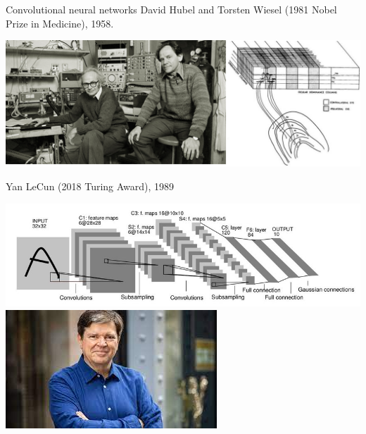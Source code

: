 \documentclass{beamer}
\begin{document}
\begin{frame}{Convolutional neural networks}
 David Hubel and Torsten Wiesel (1981 Nobel Prize in Medicine), 1958.
\begin{center}
   \includegraphics[scale=0.3]{pics/Hubel_Wiesel.pdf}
\end{center}

Yan LeCun (2018 Turing Award), 1989

\begin{center}
    \includegraphics[scale=0.25]{pics/LeCunLicenced.png}\includegraphics[scale=0.35]{pics/Lecun.jpeg}
\end{center}

    
\end{frame}
\end{document}
